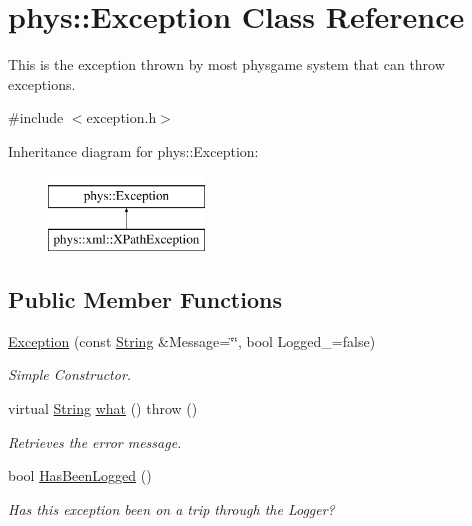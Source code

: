 \hypertarget{classphys_1_1Exception}{
\section{phys::Exception Class Reference}
\label{dc/d47/classphys_1_1Exception}
}


This is the exception thrown by most physgame system that can throw exceptions.  




{\ttfamily \#include $<$exception.h$>$}

Inheritance diagram for phys::Exception:\begin{figure}[H]
\begin{center}
\leavevmode
\includegraphics[height=2.000000cm]{dc/d47/classphys_1_1Exception}
\end{center}
\end{figure}
\subsection*{Public Member Functions}
\begin{DoxyCompactItemize}
\item 
\hyperlink{classphys_1_1Exception_a274184178b7e7589bf1dcde1643924c1}{Exception} (const \hyperlink{namespacephys_aa03900411993de7fbfec4789bc1d392e}{String} \&Message=\char`\"{}\char`\"{}, bool Logged\_\-=false)
\begin{DoxyCompactList}\small\item\em Simple Constructor. \item\end{DoxyCompactList}\item 
virtual \hyperlink{namespacephys_aa03900411993de7fbfec4789bc1d392e}{String} \hyperlink{classphys_1_1Exception_ac929f9b3929526eec6e6b581c9a9dd73}{what} ()  throw ()
\begin{DoxyCompactList}\small\item\em Retrieves the error message. \item\end{DoxyCompactList}\item 
bool \hyperlink{classphys_1_1Exception_ab1399e25435c390db551855fda338951}{HasBeenLogged} ()
\begin{DoxyCompactList}\small\item\em Has this exception been on a trip through the Logger? \item\end{DoxyCompactList}\end{DoxyCompactItemize}



